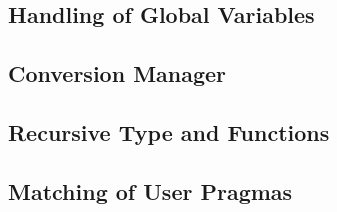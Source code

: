 \subsection{Handling of Global Variables}
\label{sec:Insieme.Frontend.Global}

\subsection{Conversion Manager}
\label{sec:Insieme.Convert}

\subsection{Recursive Type and Functions}
\label{sec:Insieme.Recursion}

\subsection{Matching of User Pragmas}
\label{sec:Insieme.Pragmas}





